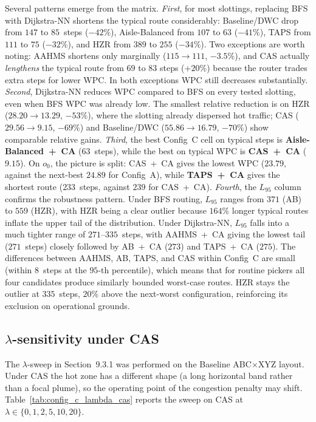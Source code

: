 \documentclass[12pt,a4paper]{article}
\begin{document}
Several patterns emerge from the matrix.
\emph{First}, for most slottings, replacing BFS with Dijkstra-NN shortens
the typical route considerably: Baseline/DWC drop from $147$ to $85$~steps
($-42\%$), Aisle-Balanced from $107$ to $63$ ($-41\%$), TAPS from $111$
to $75$ ($-32\%$), and HZR from $389$ to $255$ ($-34\%$). Two exceptions
are worth noting: AAHMS shortens only marginally ($115 \to 111$, $-3.5\%$),
and CAS actually \emph{lengthens} the typical route from $69$ to $83$ steps
($+20\%$) because the router trades extra steps for lower WPC. In both
exceptions WPC still decreases substantially.
\emph{Second}, Dijkstra-NN reduces WPC compared to BFS on every tested
slotting, even when BFS WPC was already low. The smallest relative
reduction is on HZR ($28.20 \to 13.29$, $-53\%$), where
the slotting already dispersed hot traffic; CAS ($29.56 \to 9.15$,
$-69\%$) and Baseline/DWC ($55.86 \to 16.79$, $-70\%$) show
comparable relative gains.
\emph{Third}, the best Config~C cell on typical steps is \textbf{Aisle-Balanced~+~CA}
($63$~steps), while the best on typical WPC is \textbf{CAS~+~CA} ($9.15$).
On $o_0$, the picture is split: CAS~+~CA gives the lowest WPC
($23.79$, against the next-best $24.89$ for Config~A), while
\textbf{TAPS~+~CA} gives the shortest route ($233$~steps, against
$239$ for CAS~+~CA).
\emph{Fourth}, the $L_{95}$ column confirms the robustness pattern.
Under BFS routing, $L_{95}$ ranges from $371$ (AB) to $559$ (HZR),
with HZR being a clear outlier because $164\%$ longer typical routes
inflate the upper tail of the distribution.
Under Dijkstra-NN, $L_{95}$ falls into a much tighter range of
$271$--$335$~steps, with AAHMS~+~CA giving the lowest tail
($271$~steps) closely followed by AB~+~CA ($273$) and TAPS~+~CA
($275$). The differences between AAHMS, AB, TAPS, and CAS within
Config~C are small (within $8$~steps at the $95$-th percentile),
which means that for routine pickers all four candidates produce
similarly bounded worst-case routes. HZR stays the outlier at
$335$~steps, $20\%$ above the next-worst configuration, reinforcing
its exclusion on operational grounds.

\subsection{\texorpdfstring{$\lambda$}{lambda}-sensitivity under CAS}

The $\lambda$-sweep in Section~9.3.1 was performed on the Baseline
ABC$\times$XYZ layout.
Under CAS the hot zone has a different shape (a long horizontal band
rather than a focal plume), so the operating point of the
congestion penalty may shift.
Table~\ref{tab:config_c_lambda_cas} reports the sweep on CAS at
$\lambda \in \{0, 1, 2, 5, 10, 20\}$.
\end{document}
